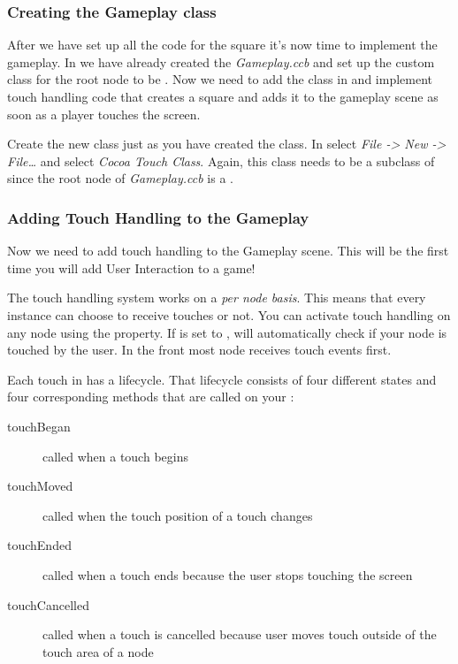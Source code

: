 \subsubsection{Creating the Gameplay class}

After we have set up all the code for the square it's now time to implement the
gameplay. In \SB{} we have already created the \ccbfile{} \textit{Gameplay.ccb}
and set up the custom class for the root node to be . Now we need to add the
 class in \xcode{} and implement touch handling code that
creates a square and adds it to the gameplay scene as soon as a player touches
the screen.

\begin{leftbar}
Create the new class just as you have created the  class. In
\xcode{} select \textit{File -> New -> File\ldots} and select
\textit{Cocoa Touch Class}. Again, this class needs to be a subclass of
\ccnode{} since the root node of \textit{Gameplay.ccb} is a \ccnode{}.
\end{leftbar}

\subsubsection{Adding Touch Handling to the
Gameplay}\label{Introduction_FirstTouchHandling} Now we need to add touch
handling to the Gameplay scene. This will be the first time you will add User Interaction to a \cocos{} game! 

The \cocos{} touch handling system works on a \textit{per node
basis}.
This means that every \ccnode{} instance can choose to receive touches or not. You
can activate touch handling on any node using the
 property. If
 is set to , \cocos{} will
automatically check if your node is touched by the user. In \cocos{} the front
most node receives touch events first.

Each touch in \cocos{} has a lifecycle. That lifecycle consists of four
different states and four corresponding methods that are called on your
\ccnode{}:

\begin{description}
\item[touchBegan] called when a
touch begins
\item[touchMoved] called when the touch position of a touch
changes
\item[touchEnded] called when a touch ends because the user
stops touching the screen
\item[touchCancelled] called when a touch is cancelled
because user moves touch outside of the touch area of a node
\end{description}

